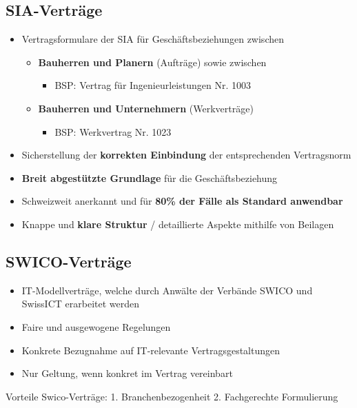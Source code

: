 \hypertarget{sia-vertruxe4ge}{%
\subsection{SIA-Verträge}\label{sia-vertruxe4ge}}

\begin{itemize}
\tightlist
\item
  Vertragsformulare der SIA für Geschäftsbeziehungen zwischen

  \begin{itemize}
  \tightlist
  \item
    \textbf{Bauherren und Planern} (Aufträge) sowie zwischen

    \begin{itemize}
    \tightlist
    \item
      BSP: Vertrag für Ingenieurleistungen Nr. 1003
    \end{itemize}
  \item
    \textbf{Bauherren und Unternehmern} (Werkverträge)

    \begin{itemize}
    \tightlist
    \item
      BSP: Werkvertrag Nr. 1023
    \end{itemize}
  \end{itemize}
\item
  Sicherstellung der \textbf{korrekten Einbindung} der entsprechenden
  Vertragsnorm
\item
  \textbf{Breit abgestützte Grundlage} für die Geschäftsbeziehung
\item
  Schweizweit anerkannt und für \textbf{80\% der Fälle als Standard
  anwendbar}
\item
  Knappe und \textbf{klare Struktur} / detaillierte Aspekte mithilfe von
  Beilagen
\end{itemize}

\hypertarget{swico-vertruxe4ge}{%
\subsection{SWICO-Verträge}\label{swico-vertruxe4ge}}

\begin{itemize}
\tightlist
\item
  IT-Modellverträge, welche durch Anwälte der Verbände SWICO und
  SwissICT erarbeitet werden
\item
  Faire und ausgewogene Regelungen
\item
  Konkrete Bezugnahme auf IT-relevante Vertragsgestaltungen
\item
  Nur Geltung, wenn konkret im Vertrag vereinbart
\end{itemize}

Vorteile Swico-Verträge: 1. Branchenbezogenheit 2. Fachgerechte
Formulierung
